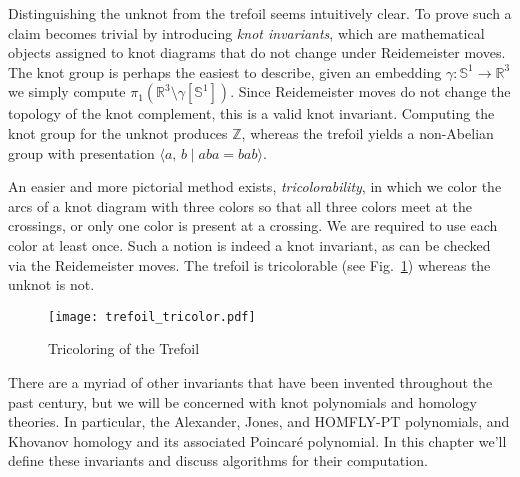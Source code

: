 Distinguishing the unknot from the trefoil seems intuitively clear. To prove
such a claim becomes trivial by introducing \textit{knot invariants}, which
are mathematical objects assigned to knot diagrams that do not change under
Reidemeister moves. The knot group is perhaps the easiest to describe, given
an embedding $\gamma:\mathbb{S}^{1}\rightarrow\mathbb{R}^{3}$ we simply
compute $\pi_{1}(\mathbb{R}^{3}\setminus\gamma[\mathbb{S}^{1}])$. Since
Reidemeister moves do not change the topology of the knot complement, this is
a valid knot invariant. Computing the knot group for the unknot produces
$\mathbb{Z}$, whereas the trefoil yields a non-Abelian group with presentation
$\langle{a,\,b}\;|\;aba=bab\rangle$.
\par\hfill\par
An easier and more pictorial method exists, \textit{tricolorability}, in which
we color the arcs of a knot diagram with three colors so that all three colors
meet at the crossings, or only one color is present at a crossing. We are
required to use each color at least once. Such a notion is indeed a knot
invariant, as can be checked via the Reidemeister moves. The trefoil is
tricolorable (see Fig.~\ref{fig:trefoil_tricolor}) whereas the unknot is not.
\par\hfill\par
\begin{figure}
    \centering
    \texttt{[image: trefoil\_tricolor.pdf]}
    \caption{Tricoloring of the Trefoil}
    \label{fig:trefoil_tricolor}
\end{figure}
There are a myriad of other invariants that have been invented throughout the
past century, but we will be concerned with knot polynomials and homology
theories. In particular, the Alexander, Jones, and HOMFLY-PT polynomials, and
Khovanov homology and its associated Poincar\'{e} polynomial. In this chapter
we'll define these invariants and discuss algorithms for their computation.

